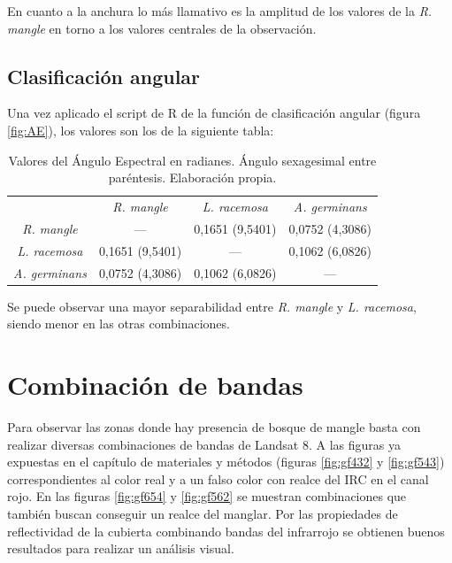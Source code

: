 En cuanto a la anchura lo más llamativo es la amplitud de los valores de la \textit{R. mangle} en torno a los valores centrales de la observación.

\subsection{Clasificación angular}
Una vez aplicado el script de R de la función de clasificación angular (figura \ref{fig:AE}), los valores son los de la siguiente tabla:

\begin{table}[ht]
	\centering	
	\begin{tabular}{@{}cccc@{}}
	\toprule[0.4mm]
	& \textit{R. mangle} & \textit{L. racemosa} & \textit{A. germinans} \\
	\textit{R. mangle} & --- & 0,1651 (9,5401) & 0,0752 (4,3086) \\
	\textit{L. racemosa} & 0,1651 (9,5401) & --- & 0,1062 (6,0826) \\
	\textit{A. germinans} & 0,0752 (4,3086) & 0,1062 (6,0826) & --- \\
	\bottomrule[0.4mm]
	\end{tabular}
	\caption[Valores de Ángulo Espectral]{Valores del Ángulo Espectral en radianes. Ángulo sexagesimal entre paréntesis. Elaboración propia.}	
\end{table}

Se puede observar una mayor separabilidad entre \textit{R. mangle} y \textit{L. racemosa}, siendo menor en las otras combinaciones.

\section{Combinación de bandas}
Para observar las zonas donde hay presencia de bosque de mangle basta con realizar diversas combinaciones de bandas de Landsat 8. A las figuras ya expuestas en el capítulo de materiales y métodos (figuras \ref{fig:gf432} y \ref{fig:gf543}) correspondientes al color real y a un falso color con realce del \ac{IRC} en el canal rojo. En las figuras \ref{fig:gf654} y \ref{fig:gf562} se muestran combinaciones que también buscan conseguir un realce del manglar. Por las propiedades de reflectividad de la cubierta combinando bandas del infrarrojo se obtienen buenos resultados para realizar un análisis visual.

